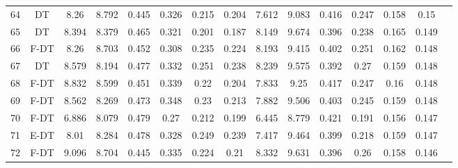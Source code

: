 \begin{longtable}{@{\hskip3pt}c@{\hskip3pt}c@{\hskip3pt}c@{\hskip3pt}c@{\hskip3pt}c@{\hskip3pt}c@{\hskip3pt}c@{\hskip3pt}c@{\hskip3pt}c@{\hskip3pt}c@{\hskip3pt}c@{\hskip3pt}c@{\hskip3pt}c@{\hskip3pt}c@{\hskip3pt}c}
         64 &             DT &              8.26 &          8.792 &           0.445 &           0.326 &           0.215 &           0.204 &               7.612 &           9.083 &           0.416 &         0.247 &          0.158 &            0.15 \\
         65 &             DT &             8.394 &          8.379 &           0.465 &           0.321 &           0.201 &           0.187 &               8.149 &           9.674 &           0.396 &         0.238 &          0.165 &           0.149 \\
         66 &           F-DT &              8.26 &          8.703 &           0.452 &           0.308 &           0.235 &           0.224 &               8.193 &           9.415 &           0.402 &         0.251 &          0.162 &           0.148 \\
         67 &             DT &             8.579 &          8.194 &           0.477 &           0.332 &           0.251 &           0.238 &               8.239 &           9.575 &           0.392 &          0.27 &          0.159 &           0.148 \\
         68 &           F-DT &             8.832 &          8.599 &           0.451 &           0.339 &            0.22 &           0.204 &               7.833 &            9.25 &           0.417 &         0.247 &           0.16 &           0.148 \\
         69 &           F-DT &             8.562 &          8.269 &           0.473 &           0.348 &            0.23 &           0.213 &               7.882 &           9.506 &           0.403 &         0.245 &          0.159 &           0.148 \\
         70 &           F-DT &             6.886 &          8.079 &           0.479 &            0.27 &           0.212 &           0.199 &               6.445 &           8.779 &           0.421 &         0.191 &          0.156 &           0.147 \\
         71 &           E-DT &              8.01 &          8.284 &           0.478 &           0.328 &           0.249 &           0.239 &               7.417 &           9.464 &           0.399 &         0.218 &          0.159 &           0.147 \\
         72 &           F-DT &             9.096 &          8.704 &           0.445 &           0.335 &           0.224 &            0.21 &               8.332 &           9.631 &           0.396 &          0.26 &          0.158 &           0.146 \\

\end{longtable}
